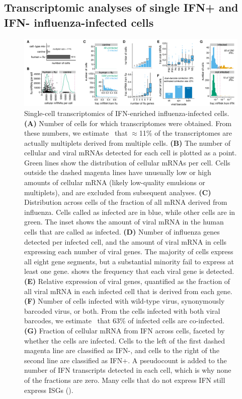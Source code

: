 \documentclass[9pt,lineno]{template}
\begin{document}
\subsection{Transcriptomic analyses of single IFN+ and IFN- influenza-infected cells}

\begin{figure}
\begin{fullwidth}

\includegraphics[width=\linewidth, clip=false]{figures/single_cell_figures/p_cell_summary.pdf}

\caption{
Single-cell transcriptomics of IFN-enriched influenza-infected cells.
{\bf (A)} 
Number of cells for which transcriptomes were obtained.
From these numbers, we estimate~\citep{bloom2018estimating} that $\approx$11\% of the transcriptomes are actually multiplets derived from multiple cells. 
{\bf (B)} The number of cellular and viral mRNAs detected for each cell is plotted as a point.
Green lines show the distribution of cellular mRNAs per cell.
Cells outside the dashed magenta lines have unusually low or high amounts of cellular mRNA (likely low-quality emulsions or multiplets), and are excluded from subsequent analyses.
{\bf (C)} Distribution across cells of the fraction of all mRNA derived from influenza.
Cells called as infected are in blue, while other cells are in green.
The inset shows the amount of viral mRNA in the human cells that are called as infected.
{\bf (D)} Number of influenza genes detected per infected cell, and the amount of viral mRNA in cells expressing each number of viral genes.
The majority of cells express all eight gene segments, but a substantial minority fail to express at least one gene.
 shows the frequency that each viral gene is detected.
{\bf (E)} Relative expression of viral genes, quantified as the fraction of all viral mRNA in each infected cell that is derived from each gene.
{\bf (F)} Number of cells infected with wild-type virus, synonymously barcoded virus, or both.
From the cells infected with both viral barcodes, we estimate~\citep{bloom2018estimating} that 63\% of infected cells are co-infected.
{\bf (G)} Fraction of cellular mRNA from IFN across cells, faceted by whether the cells are infected.
Cells to the left of the first dashed magenta line are classified as IFN-, and cells to the right of the second line are classified as IFN+.
A pseudocount is added to the number of IFN transcripts detected in each cell, which is why none of the fractions are zero.
Many cells that do not express IFN still express ISGs ().
}
\label{fig:transcriptomics}


\end{fullwidth}
\end{figure}
\end{document}
